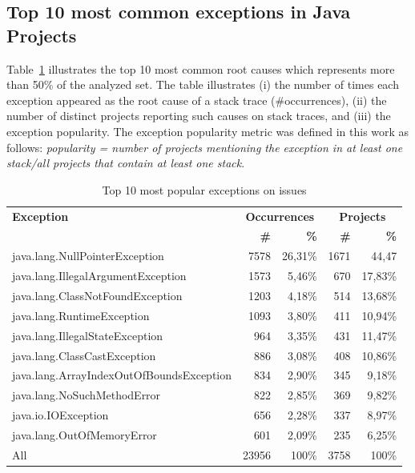 \documentclass[conference]{IEEEtran}
\begin{document}
\subsection{Top 10 most common exceptions in Java Projects}

Table~\ref{tab:toptenjava} illustrates the top 10 most common root causes which
represents more than 50\% of the analyzed set. The table illustrates  (i) the
number of times each exception appeared as the root cause of a stack trace
(\#occurrences), (ii) the number of distinct projects reporting such causes on
stack traces, and (iii) the exception popularity. The exception popularity
metric was defined in this work as follows: \emph{popularity = number of
projects mentioning the exception in at least one stack/all projects that
contain at least one stack}.

\begin{table}
\begin{tabular}{lrrrr}
    \hline
    \bfseries{Exception} &  \multicolumn{2}{c}{\bfseries{Occurrences}} &  \multicolumn{2}{c}{\bfseries{Projects}}\\
    & \bfseries{\#} &  \bfseries{\%} & \bfseries{\# } & \bfseries{\% } \\
    \hline
java.lang.NullPointerException             & 7578 & 26,31\% & 1671 & 44,47 \\
java.lang.IllegalArgumentException         & 1573 & 5,46\%  & 670  & 17,83\% \\
java.lang.ClassNotFoundException           & 1203 & 4,18\%  & 514  & 13,68\% \\
java.lang.RuntimeException                 & 1093 & 3,80\%  & 411  & 10,94\% \\
java.lang.IllegalStateException            & 964  & 3,35\%  & 431  & 11,47\% \\
java.lang.ClassCastException               & 886  & 3,08\%  & 408  & 10,86\% \\
java.lang.ArrayIndexOutOfBoundsException   & 834  & 2,90\%  & 345  & 9,18\% \\
java.lang.NoSuchMethodError                & 822  & 2,85\%  & 369  & 9,82\% \\
java.io.IOException                        & 656  & 2,28\%  & 337  & 8,97\% \\
java.lang.OutOfMemoryError                 & 601  & 2,09\%  & 235  & 6,25\% \\
\hline
All	 &	23956 &	100\%	& 3758 & 100\%	 \\
\hline
  \end{tabular}
\caption{Top 10 most popular exceptions on issues}
\label{tab:toptenjava}
\end{table}
\end{document}
